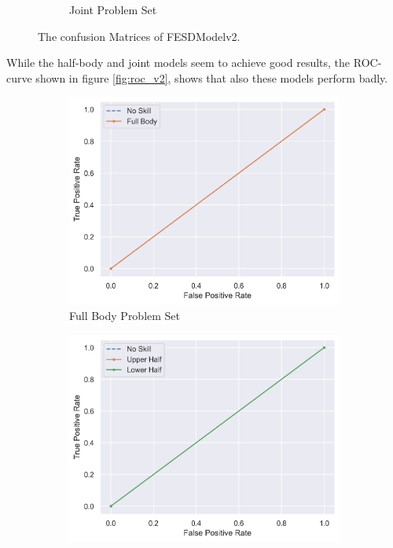 \begin{figure}
\begin{subfigure}[b]{0.47\linewidth}
      \caption{Joint Problem Set}
      \label{fig:jt_conf}
  \end{subfigure}
  \caption[Confusion Matrices of FESDModelv2]{The confusion Matrices of FESDModelv2.}
  \label{fig:conf_v2}
\end{figure}

While the half-body and joint models seem to achieve good results, the ROC-curve shown in figure \ref{fig:roc_v2}, shows that also these models perform badly.

\begin{figure}
  \centering
  \begin{subfigure}[b]{0.47\linewidth}
      \centering
      \includegraphics[width=\textwidth]{figures/Results/v2_bs_40_is_64_e_100/fb/roc.png}
      \caption[]{Full Body Problem Set}
      \label{fig:fb_roc_v2}
  \end{subfigure}
  \hfill
  \begin{subfigure}[b]{0.47\linewidth}
      \centering
      \includegraphics[width=\textwidth]{figures/Results/v2_bs_40_is_64_e_100/hb/roc.png}

\end{subfigure}
\end{figure}
